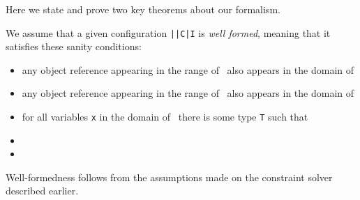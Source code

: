 


Here we state and prove two key theorems about our formalism.


We
assume that a given configuration {\tt \Euid|\Huid|C|I} is {\em well
  formed}, meaning that it satisfies these sanity conditions:
\begin{itemize}
  \item any object reference appearing in the range of \Euid\ also
    appears in the domain of \Huid  
 \item any object reference appearing in the range of \Huid\ also
    appears in the domain of \Huid
 \item for all variables {\tt x} in the domain of \Euid\ there is some
   type {\tt T} such that 
 \item {}
 \item {}
\end{itemize}
Well-formedness follows from the assumptions made on the constraint
solver described earlier.

